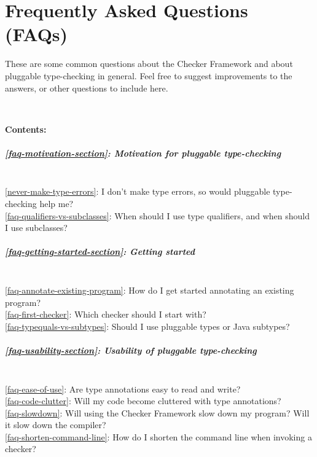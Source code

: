 \htmlhr
\chapter{Frequently Asked Questions (FAQs)\label{faq}}

These are some common questions about the Checker Framework and about
pluggable type-checking in general.  Feel free to suggest improvements to
the answers, or other questions to include here.


~

\newcommand{\faqtocpara}[1]{\paragraph{#1} ~}


\noindent
\textbf{Contents:}

\faqtocpara{\ref{faq-motivation-section}: Motivation for pluggable type-checking}
\\ \ref{never-make-type-errors}: I don't make type errors, so would pluggable type-checking help me?
\\ \ref{faq-qualifiers-vs-subclasses}: When should I use type qualifiers, and when should I use subclasses?

\faqtocpara{\ref{faq-getting-started-section}: Getting started}
\\ \ref{faq-annotate-existing-program}: How do I get started annotating an existing program?
\\ \ref{faq-first-checker}: Which checker should I start with?
\\ \ref{faq-typequals-vs-subtypes}: Should I use pluggable types or Java subtypes?

\faqtocpara{\ref{faq-usability-section}: Usability of pluggable type-checking}
\\ \ref{faq-ease-of-use}: Are type annotations easy to read and write?
\\ \ref{faq-code-clutter}: Will my code become cluttered with type annotations?
\\ \ref{faq-slowdown}: Will using the Checker Framework slow down my program?  Will it slow down the compiler?
\\ \ref{faq-shorten-command-line}: How do I shorten the command line when invoking a checker?

